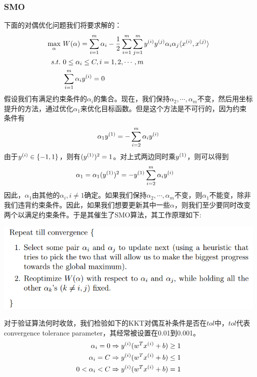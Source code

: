 \subsubsection{SMO}
下面的对偶优化问题我们将要求解的：
\begin{eqnarray}
\begin{aligned}
\max_\alpha&\ W(\alpha)=\sum_{i=1}^m\alpha_i-\frac{1}{2}\sum_{i=1}^m\sum_{j=1}^m\sample{y}{i}\sample{y}{j}\alpha_i\alpha_j\langle\sample{x}{i},\sample{x}{j}\rangle\\
s.t.&\ 0\leq \alpha_i \leq C,i=1,2,\cdots,m\\
&\ \sum_{i=1}^m\alpha_i\sample{y}{i}=0
\end{aligned}
\end{eqnarray}
假设我们有满足约束条件的$\alpha_i$的集合。现在，我们保持$\alpha_2,\cdots,\alpha_m$不变，然后用坐标提升的方法，通过优化$\alpha_1$来优化目标函数。但是这个方法是不可行的，因为约束条件有
\begin{eqnarray}
\alpha_1{y}^{({1})}=-\sum_{i=2}^m\alpha_i{y}^{({i})}
\end{eqnarray}
由于${y}^{({i})}\in\{-1,1\}$，则有$({y}^{({1})})^2=1$。对上式两边同时乘${y}^{({1})}$，则可以得到
\begin{eqnarray}
\begin{aligned}
\alpha_1&=\alpha_1({y}^{({1})})^2=-{y}^{({1})}\sum_{i=2}^m\alpha_i{y}^{({i})}
\end{aligned}
\end{eqnarray}
因此，$\alpha_1$由其他的$\alpha_i,i\neq1$确定。如果我们保持$\alpha_2,\cdots,\alpha_m$不变，则$\alpha_1$不能变，除非我们违背约束条件。因此，如果我们想要更新其中一些$\alpha$，则我们至少要同时改变两个以满足约束条件。于是其催生了SMO算法，其工作原理如下:
\begin{center}
\includegraphics[scale=1]{../figures/SVM6.PNG} 
\end{center}
对于验证算法何时收敛，我们检验如下的KKT对偶互补条件是否在$tol$中，$tol$代表convergence tolerance parameter，其经常被设置在0.01到0.001。
\begin{eqnarray}
\alpha_i=0 \Rightarrow {y}^{({i})}(w^T{x}^{({i})}+b)\geq 1\\
\alpha_i=C \Rightarrow {y}^{({i})}(w^T{x}^{({i})}+b)\leq 1\\
0<\alpha_i<C \Rightarrow {y}^{({i})}(w^T{x}^{({i})}+b)=1
\end{eqnarray}
